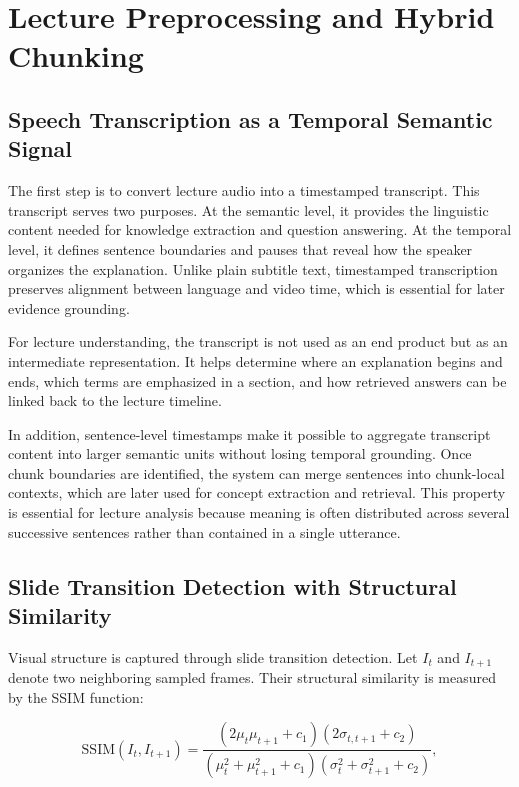 \section{Lecture Preprocessing and Hybrid Chunking}

\subsection{Speech Transcription as a Temporal Semantic Signal}

The first step is to convert lecture audio into a timestamped transcript. This transcript serves two purposes. At the semantic level, it provides the linguistic content needed for knowledge extraction and question answering. At the temporal level, it defines sentence boundaries and pauses that reveal how the speaker organizes the explanation. Unlike plain subtitle text, timestamped transcription preserves alignment between language and video time, which is essential for later evidence grounding.

For lecture understanding, the transcript is not used as an end product but as an intermediate representation. It helps determine where an explanation begins and ends, which terms are emphasized in a section, and how retrieved answers can be linked back to the lecture timeline.

In addition, sentence-level timestamps make it possible to aggregate transcript content into larger semantic units without losing temporal grounding. Once chunk boundaries are identified, the system can merge sentences into chunk-local contexts, which are later used for concept extraction and retrieval. This property is essential for lecture analysis because meaning is often distributed across several successive sentences rather than contained in a single utterance.

\subsection{Slide Transition Detection with Structural Similarity}

Visual structure is captured through slide transition detection. Let $I_t$ and $I_{t+1}$ denote two neighboring sampled frames. Their structural similarity is measured by the SSIM function:

\begin{equation}
\mathrm{SSIM}(I_t, I_{t+1}) =
\frac{(2\mu_t\mu_{t+1} + c_1)(2\sigma_{t,t+1} + c_2)}
{(\mu_t^2 + \mu_{t+1}^2 + c_1)(\sigma_t^2 + \sigma_{t+1}^2 + c_2)},
\end{equation}


